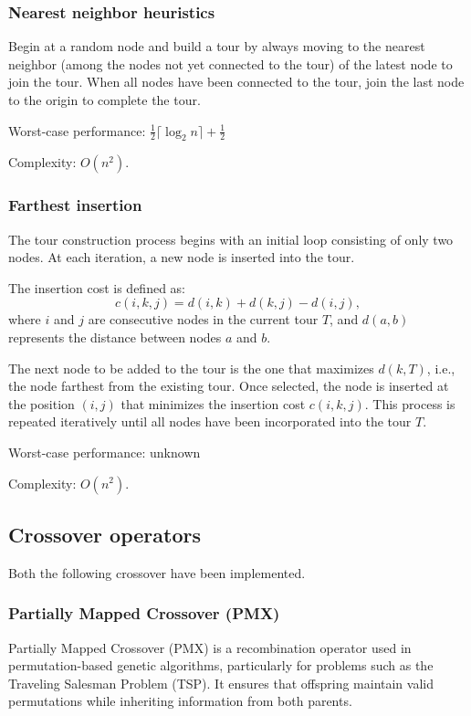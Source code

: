 \documentclass[../main.tex]{subfiles}
\begin{document}
\subsubsection{Nearest neighbor heuristics}

Begin at a random node  and build a tour by always moving to the nearest neighbor (among the nodes not yet connected to  
the tour) of the latest node to join the tour. When all nodes have been connected  to the tour, join the last node to the origin to complete the tour.\cite{mitlogisticaltransportation}


Worst-case performance: $\frac{1}{2} \lceil \log_2 n \rceil + \frac{1}{2}$

Complexity: $O(n^2)$.

\subsubsection{Farthest insertion}
The tour construction process begins with an initial loop consisting of only two nodes. At each iteration, a new node is inserted into the tour.  

The insertion cost is defined as:  
\begin{equation}
    c(i, k, j) = d(i, k) + d(k, j) - d(i, j),
\end{equation}
where $i$ and $j$ are consecutive nodes in the current tour $T$, and $d(a, b)$ represents the distance between nodes $a$ and $b$.  

The next node to be added to the tour is the one that maximizes $d(k, T)$, i.e., the node farthest from the existing tour. Once selected, the node is inserted at the position $(i, j)$ that minimizes the insertion cost $c(i, k, j)$. This process is repeated iteratively until all nodes have been incorporated into the tour $T$.

Worst-case performance: unknown \cite{mitlogisticaltransportation}

Complexity: $O(n^2)$.
\subsection{Crossover operators}

Both the following crossover have been implemented.
\subsubsection{Partially Mapped Crossover (PMX)}

Partially Mapped Crossover (PMX) is a recombination operator used in permutation-based genetic algorithms, particularly for problems such as the Traveling Salesman Problem (TSP). It ensures that offspring maintain valid permutations while inheriting information from both parents.
\end{document}
